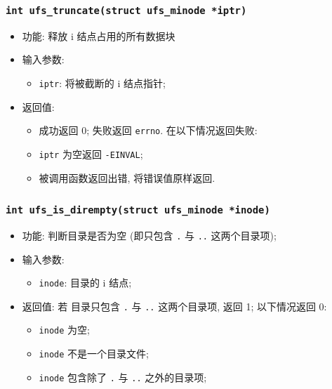 \documentclass[nofonts]{ctexart}
\begin{document}
  \subsubsection{\texttt{int ufs\_truncate(struct ufs\_minode *iptr)}}
  \begin{itemize}
\item
  功能: 释放 i 结点占用的所有数据块
\item
  输入参数:

  \begin{itemize}
  \item
    \texttt{iptr}: 将被截断的 i 结点指针;
  \end{itemize}
\item
  返回值:

  \begin{itemize}
  \item
    成功返回 0; 失败返回 \texttt{errno}. 在以下情况返回失败:
  \item
    \texttt{iptr} 为空返回 \texttt{-EINVAL};
  \item
    被调用函数返回出错, 将错误值原样返回.
  \end{itemize}
  \end{itemize}
  \subsubsection{\texttt{int ufs\_is\_dirempty(struct ufs\_minode *inode)}}

  \begin{itemize}
\item
  功能: 判断目录是否为空 (即只包含 \texttt{.} 与 \texttt{..}
  这两个目录项);
\item
  输入参数:

  \begin{itemize}
  \item
    \texttt{inode}: 目录的 i 结点;
  \end{itemize}
\item
  返回值: 若 目录只包含 \texttt{.} 与 \texttt{..} 这两个目录项, 返回 1;
  以下情况返回 0:

  \begin{itemize}
  \item
    \texttt{inode} 为空;
  \item
    \texttt{inode} 不是一个目录文件;
  \item
    \texttt{inode} 包含除了 \texttt{.} 与 \texttt{..} 之外的目录项;
  \end{itemize}
  \end{itemize}
\end{document}
